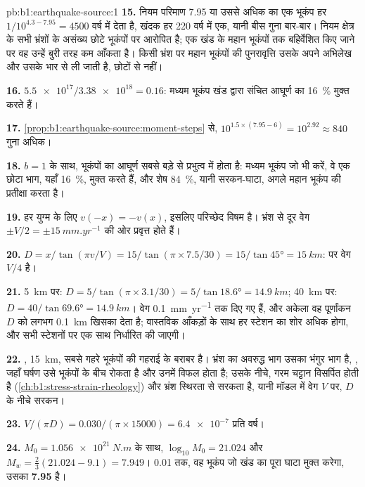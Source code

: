 \begin{solution}{pb:b1:earthquake-source:1}
\textbf{15.} नियम परिमाण 7.95 या उससे अधिक का एक भूकंप हर
$1/10^{4.3 - 7.95} = \num{4500}$ वर्ष में देता है, खंदक हर 220 वर्ष में एक, यानी बीस गुना बार-बार। नियम क्षेत्र के सभी भ्रंशों के असंख्य छोटे भूकंपों पर आरोपित है; एक खंड के महान भूकंपों तक बहिर्वेशित किए जाने पर वह उन्हें बुरी तरह कम आँकता है। किसी भ्रंश पर महान भूकंपों की पुनरावृत्ति उसके अपने अभिलेख और उसके भार से ली जाती है, छोटों से नहीं।

\textbf{16.} $\num{5.5e17}/\num{3.38e18} = 0.16$: मध्यम भूकंप खंड द्वारा
संचित आघूर्ण का \qty{16}{\percent} मुक्त करते हैं।

\textbf{17.} \cref{prop:b1:earthquake-source:moment-steps} से,
$10^{1.5\times(7.95 - 6)} = 10^{2.92} \approx 840$ गुना अधिक।

\textbf{18.} $b = 1$ के साथ, भूकंपों का आघूर्ण सबसे बड़े से प्रभुत्व में होता है: मध्यम भूकंप जो भी करें, वे एक छोटा भाग, यहाँ \qty{16}{\percent}, मुक्त करते हैं, और शेष \qty{84}{\percent}, यानी सरकन-घाटा, अगले महान भूकंप की प्रतीक्षा करता है।

\textbf{19.} हर युग्म के लिए $v(-x) = -v(x)$, इसलिए परिच्छेद विषम है।
भ्रंश से दूर वेग $\pm V/2 = \pm\qty{15}{mm.yr^{-1}}$ की ओर प्रवृत्त होते हैं।

\textbf{20.} $D = x/\tan(\pi v/V) = 15/\tan(\pi\times7.5/30) = 15/\tan\ang{45} =
\qty{15}{km}$:  पर वेग $V/4$ है।

\textbf{21.} \qty{5}{km} पर: $D = 5/\tan(\pi\times3.1/30) = 5/\tan\ang{18.6} =
\qty{14.9}{km}$; \qty{40}{km} पर: $D = 40/\tan\ang{69.6} = \qty{14.9}{km}$। वेग \qty{0.1}{mm.yr^{-1}} तक दिए गए हैं, और अकेला वह पूर्णांकन $D$ को लगभग \qty{0.1}{km} खिसका देता है; वास्तविक आँकड़ों के साथ हर स्टेशन का शोर अधिक होगा, और  सभी स्टेशनों पर एक साथ निर्धारित की जाएगी।

\textbf{22.} , \qty{15}{km}, सबसे गहरे भूकंपों की गहराई के बराबर है। भ्रंश का अवरुद्ध भाग उसका भंगुर भाग है, , जहाँ घर्षण उसे भूकंपों के बीच रोकता है और उनमें विफल होता है; उसके नीचे, गरम चट्टान विसर्पित होती है (\cref{ch:b1:stress-strain-rheology}) और भ्रंश स्थिरता से सरकता है, यानी मॉडल में वेग $V$ पर, $D$ के नीचे सरकन।

\textbf{23.} $V/(\pi D) = \num{0.030}/(\pi\times\num{15000}) = \num{6.4e-7}$
प्रति वर्ष।

\textbf{24.} $M_0 = \qty{1.056e21}{N.m}$ के साथ, $\log_{10}M_0 = 21.024$ और
$M_w = \tfrac23(21.024 - 9.1) = 7.949$। 0.01 तक, वह भूकंप जो खंड का पूरा घाटा मुक्त करेगा, उसका 
\textbf{7.95} है।
\end{solution}
